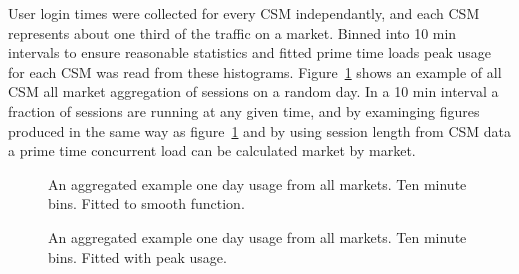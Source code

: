 \documentclass{article}
\begin{document}
User login times were collected for every CSM independantly, and each CSM represents about one third of the traffic on a market. Binned into 10 min intervals to ensure reasonable statistics and fitted prime time loads peak usage for each CSM was read from these histograms. Figure~\ref{FIGURE-DailyUse} shows an example of all CSM all market aggregation of sessions on a random day. In a 10 min interval a fraction of sessions are running at any given time, and by examinging figures produced in the same way as figure~\ref{FIGURE-DailyUse} and by using session length from CSM data a prime time concurrent load can be calculated market by market. 

\begin{figure}[!htb]
        \caption{\label{FIGURE-DailyUse} An aggregated example one day usage from all markets. Ten minute bins. Fitted to smooth function.}
\end{figure}

\begin{figure}[!htb]
        \caption{\label{FIGURE-DailyUseWithSpikes} An aggregated example one day usage from all markets. Ten minute bins. Fitted with peak usage.}
\end{figure}
\end{document}
